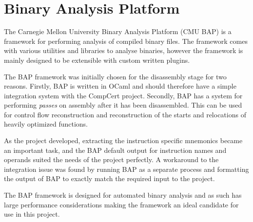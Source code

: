 
\section{Binary Analysis Platform}\label{BAP}
The Carnegie Mellon University Binary Analysis Platform (CMU BAP)\cite{brumley2011bap} is a framework for performing analysis of compiled binary files. The framework comes with various utilities and libraries to analyse binaries, however the framework is mainly designed to be extensible with custom written plugins.

The BAP framework was initially chosen for the disassembly stage for two reasons. Firstly, BAP is written in OCaml and should therefore have a simple integration system with the CompCert project. Secondly, BAP has a system for performing \textit{passes} on assembly after it has been disassembled. This can be used for control flow reconstruction and reconstruction of the starts and relocations of heavily optimized functions. 

As the project developed, extracting the instruction specific mnemonics became an important task, and the BAP default output for instruction names and operands suited the needs of the project perfectly. A workaround to the integration issue was found by running BAP as a separate process and formatting the output of BAP to exactly match the required input to the project.

The BAP framework is designed for automated binary analysis and as such has large performance considerations making the framework an ideal candidate for use in this project. 



